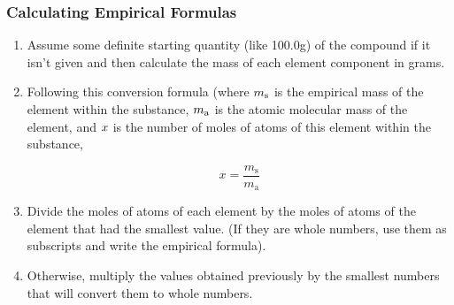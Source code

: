 \subsubsection{Calculating Empirical Formulas}

\begin{enumerate}
\item Assume some definite starting quantity (like 100.0g) of the compound if it isn't given and then calculate the mass of each element component in grams.
\item Following this conversion formula (where $\displaystyle m_{\text{s}}$ is the empirical mass of the element within the substance, $\displaystyle m_{\text{a}}$ is the atomic molecular mass of the element, and $\displaystyle x$ is the number of moles of atoms of this element within the substance,

\begin{equation}
x = \frac{m_{\text{s}}}{m_{\text{a}}}
\end{equation}

\item Divide the moles of atoms of each element by the moles of atoms of the element that had the smallest value. (If they are whole numbers, use them as subscripts and write the empirical formula).
\item Otherwise, multiply the values obtained previously by the smallest numbers that will convert them to whole numbers.
\end{enumerate}

